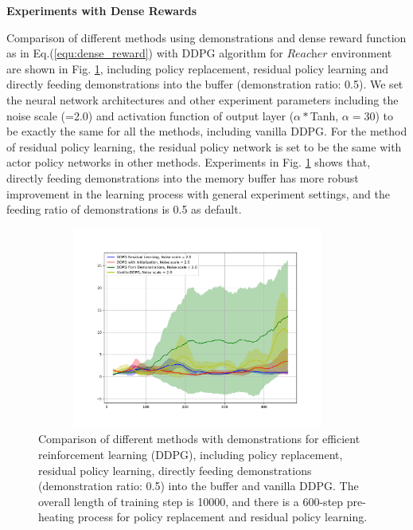 \documentclass{article}
\begin{document}
\textbf{Experiments with Dense Rewards}

Comparison of different methods using demonstrations and dense reward function as in Eq.(\ref{equ:dense_reward}) with DDPG algorithm for $\textit{Reacher}$ environment are shown in Fig. \ref{fig:comparion3}, including policy replacement, residual policy learning and directly feeding demonstrations into the buffer (demonstration ratio: 0.5). We set the neural network architectures and other experiment parameters including the noise scale (=2.0) and activation function of output layer ($\alpha*$Tanh, $\alpha=30$) to be exactly the same for all the methods, including vanilla DDPG. For the method of residual policy learning, the residual policy network is set to be the same with actor policy networks in other methods. Experiments in Fig. \ref{fig:comparion3} shows that, directly feeding demonstrations into the memory buffer has more robust improvement in the learning process with general experiment settings, and the feeding ratio of demonstrations is 0.5 as default.
\begin{figure}[htbp]
	\centering
	\includegraphics[height=250, width=400]{img/compare3.pdf}
	\caption{Comparison of different methods with demonstrations for efficient reinforcement learning (DDPG), including policy replacement, residual policy learning, directly feeding demonstrations (demonstration ratio: 0.5) into the buffer and vanilla DDPG. The overall length of training step is 10000, and there is a 600-step pre-heating process for policy replacement and residual policy learning.}
	\label{fig:comparion3}
\end{figure}
\end{document}
